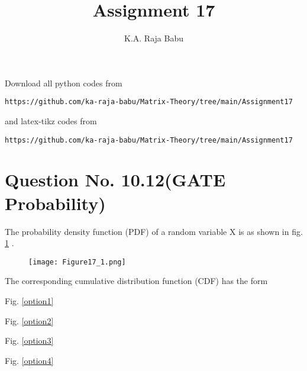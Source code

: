 \documentclass[journal,12pt,twocolumn]{IEEEtran}
\begin{document}
\makeatother
\let\StandardTheFigure\thefigure
\let\vec\mathbf
\renewcommand{\thefigure}{\theproblem}
\def\putbox#1#2#3{\makebox[0in][l]{\makebox[#1][l]{}\raisebox{\baselineskip}[0in][0in]{\raisebox{#2}[0in][0in]{#3}}}}
     \def\rightbox#1{\makebox[0in][r]{#1}}
     \def\centbox#1{\makebox[0in]{#1}}
     \def\topbox#1{\raisebox{-\baselineskip}[0in][0in]{#1}}
     \def\midbox#1{\raisebox{-0.5\baselineskip}[0in][0in]{#1}}
\vspace{3cm}
\title{Assignment 17}
\author{K.A. Raja Babu}
\maketitle
\newpage
\bigskip
\renewcommand{\thefigure}{\theenumi}
\renewcommand{\thetable}{\theenumi}
Download all python codes from 
\begin{lstlisting}
https://github.com/ka-raja-babu/Matrix-Theory/tree/main/Assignment17
\end{lstlisting}
%
and latex-tikz codes from 
%
\begin{lstlisting}
https://github.com/ka-raja-babu/Matrix-Theory/tree/main/Assignment17
\end{lstlisting}
%
\section{Question No. 10.12(GATE Probability)}

The probability density function (PDF) of a random variable X is as shown in fig. \ref{question} .

\begin{figure}[!ht]
\centering
\texttt{[image: Figure17\_1.png]}
\caption{}
\label{question}	
\end{figure}

The corresponding cumulative distribution function (CDF) has the form

\begin{enumerate}
\begin{multicols}{2}
\setlength\itemsep{2em}
\item Fig. \ref{option1}
\item Fig. \ref{option2}
\item Fig. \ref{option3}
\item Fig. \ref{option4}
\end{multicols}
\end{enumerate}
\end{document}

